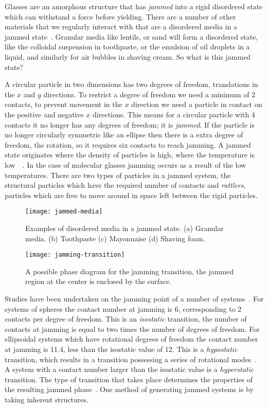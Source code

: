 Glasses are an amorphous structure that has \emph{jammed} into a rigid disordered state which can withstand a force before yielding. There are a number of other materials that we regularly interact with that are a disordered media in a jammed state~. Granular media like lentils, or sand will form a disordered state, like the colloidal suspension in toothpaste, or the emulsion of oil droplets in a liquid, and similarly for air bubbles in shaving cream. So what is this jammed state?

A circular particle in two dimensions has two degrees of freedom, translations in the $x$ and $y$ directions. To restrict a degree of freedom we need a minimum of 2 contacts, to prevent movement in the $x$ direction we need a particle in contact on the positive and negative $x$ directions. This means for a circular particle with 4 contacts it no longer has any degrees of freedom; it is \emph{jammed}. If the particle is no longer circularly symmetric like an ellipse then there is a extra degree of freedom, the rotation, so it requires six contacts to reach jamming. A jammed state originates where the density of particles is high, where the temperature is low~~\cite{liu:98,ohern:03,vanhecke:10}. In the case of molecular glasses jamming occurs as a result of the low temperatures. There are two types of particles in a jammed system, the structural particles which have the required number of contacts and \emph{rattlers}, particles which are free to move around in space left between the rigid particles. 


\begin{figure}
    \centering
    \texttt{[image: jammed-media]}
    \caption{Examples of disordered media in a jammed state. (a) Granular media. (b) Toothpaste (c) Mayonnaise (d) Shaving foam.}
    \label{fig:jammed media}
\end{figure}

\begin{figure}
    \centering
    \texttt{[image: jamming-transition]}
    \caption{A possible phase diagram for the jamming transition, the jammed region at the center is enclosed by the surface.}
    \label{fig:jammed media}
\end{figure}

Studies have been undertaken on the jamming point of a number of systems~\cite{vanhecke:09}. For systems of spheres the contact number at jamming is 6, corresponding to 2 contacts per degree of freedom. This is an \emph{isostatic} transition, the number of contacts at jamming is equal to two times the number of degrees of freedom. For ellipsoidal systems which have rotational degrees of freedom the contact number at jamming is 11.4, less than the isostatic value of 12. This is a \emph{hypostatic} transition, which results in a transition possessing a series of rotational modes~\cite{mailman:09}. A system with a contact number larger than the isostatic value is a \emph{hyperstatic} transition. The type of transition that takes place determines the properties of the resulting jammed phase~\cite{schreck:11}. One method of generating jammed systems is by taking inherent structures.

